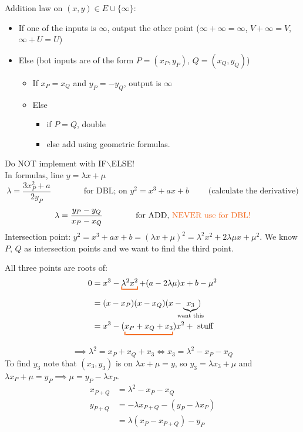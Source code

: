Addition law on $(x,y) \in E \cup \{\infty\}$:
\begin{itemize}
\item If one of the inputs is $\infty$, output the other point ($\infty + \infty = \infty$, $V + \infty = V$, $\infty + U = U$)
\item Else (bot inputs are of the form $P=(x_P,y_P)$, $Q=(x_Q,y_Q)$)
\begin{itemize}
\item If $x_P = x_Q$ and $y_P = -y_Q$, output is $\infty$
\item Else
\begin{itemize}
\item if $P=Q$, double
\item else add using geometric formulas.
\end{itemize}
\end{itemize}
\end{itemize}

Do \textcolor{ocre}{NOT} implement with IF$\backslash$ELSE! \\

In formulas, line $y=\lambda x + \mu$
\[
\lambda = \frac{3x_P^2+a}{2y_P} \qquad \qquad \text{for DBL; on } y^2 = x^3 + ax +b \qquad \text{ (calculate the derivative)}
\]
\[
\lambda = \frac{y_P-y_Q}{x_P-x_Q} \qquad \qquad \text{for ADD, \textcolor{ocre}{NEVER use for DBL!}}
\]
Intersection point: $y^2 = x^3+ax+b = (\lambda x+\mu)^2 = \lambda^2x^2+2\lambda\mu x + \mu ^2$. We know $P$, $Q$ as intersection points and we want to find the third point.

All three points are roots of:
\begin{align*}
0&=x^3 - \colub{\lambda^2 x^2}_{} + (a-2 \lambda \mu )x + b - \mu^2 \\
&= (x-x_P)(x-x_Q)(x-\underbrace{x_3}_{\mathclap{\text{want this}}}) \\
&= x^3 - (\colub{x_P+x_Q+x_3}_{})x^2 + \text{ stuff}
\end{align*}
\[
\implies \lambda^2 = x_P + x_Q + x_3 \iff x_3 = \lambda^2 - x_P - x_Q
\]
To find $y_3$ note that $(x_3,y_3)$ is on $\lambda x + \mu = y$, so $y_3 = \lambda x_3 + \mu$ and $\lambda x_P + \mu = y_P \implies \mu = y_P - \lambda x_P$.
\begin{align*}
x_{P+Q} &= \lambda^2 - x_P - x_Q \\
y_{P+Q} &= - \lambda x_{P+Q} - (y_P - \lambda x_P)\\
&= \lambda (x_P - x_{P+Q}) - y_P
\end{align*}

